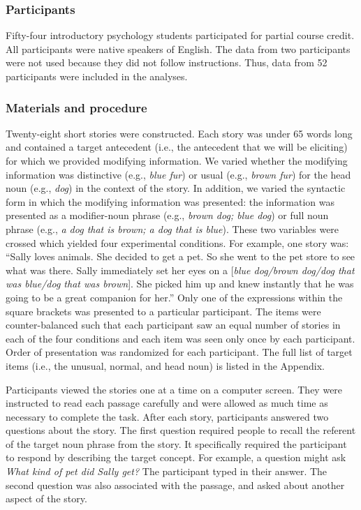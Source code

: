 \documentclass[output=paper]{langsci/langscibook}
\begin{document}
\subsubsection{Participants}

Fifty-four introductory psychology students participated for partial
course credit. All participants were native speakers of English. The
data from two participants were not used because they did not follow
instructions. Thus, data from 52 participants were included in the
analyses.

\subsubsection{Materials and procedure}

Twenty-eight short stories were constructed. Each story was under 65
words long and contained a target antecedent (i.e., the antecedent
that we will be eliciting) for which we provided modifying
information. We varied whether the modifying information was
distinctive (e.g., \textit{blue fur}) or usual (e.g., \textit{brown
  fur}) for the head noun (e.g., \textit{dog}) in the context of the
story. In addition, we varied the syntactic form in which the
modifying information was presented: the information was presented as
a modifier-noun phrase (e.g., \textit{brown dog; blue dog}) or full
noun phrase (e.g., \textit{a dog that is brown; a dog that is
  blue}). These two variables were crossed which yielded four
experimental conditions. For example, one story was: “Sally loves
animals. She decided to get a pet. So she went to the pet store to see
what was there.  Sally immediately set her eyes on a [\textit{blue
  dog/brown dog/dog that was blue/dog that was brown}].  She picked
him up and knew instantly that he was going to be a great companion
for her.” Only one of the expressions within the square brackets was
presented to a particular participant. The items were counter-balanced
such that each participant saw an equal number of stories in each of
the four conditions and each item was seen only once by each
participant. Order of presentation was randomized for each
participant. The full list of target items (i.e., the unusual, normal,
and head noun) is listed in the Appendix.

Participants viewed the stories one at a time on a computer
screen. They were instructed to read each passage carefully and were
allowed as much time as necessary to complete the task.  After each
story, participants answered two questions about the story. The first
question required people to recall the referent of the target noun
phrase from the story. It specifically required the participant to
respond by describing the target concept. For example, a question
might ask \textit{What kind of pet did Sally get?} The participant
typed in their answer. The second question was also associated with
the passage, and asked about another aspect of the story.
\end{document}
